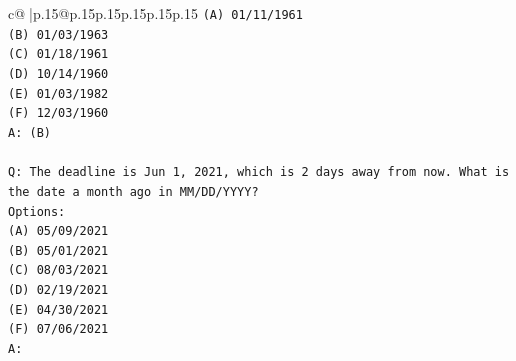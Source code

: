 \documentclass{article}
\begin{document}
{\begin{supertabular}{c@{$\;$}|p{.15\linewidth}@{}p{.15\linewidth}p{.15\linewidth}p{.15\linewidth}p{.15\linewidth}p{.15\linewidth}}
{{{\texttt{(A) 01/11/1961} \\
\texttt{(B) 01/03/1963} \\
\texttt{(C) 01/18/1961} \\
\texttt{(D) 10/14/1960} \\
\texttt{(E) 01/03/1982} \\
\texttt{(F) 12/03/1960} \\
\texttt{A: (B)} \\
\\ 
\texttt{Q: The deadline is Jun 1, 2021, which is 2 days away from now. What is the date a month ago in MM/DD/YYYY?} \\
\texttt{Options:} \\
\texttt{(A) 05/09/2021} \\
\texttt{(B) 05/01/2021} \\
\texttt{(C) 08/03/2021} \\
\texttt{(D) 02/19/2021} \\
\texttt{(E) 04/30/2021} \\
\texttt{(F) 07/06/2021} \\
\texttt{A:} \\
            }
        }
    }
     \\ \\


\end{supertabular}}
\end{document}
